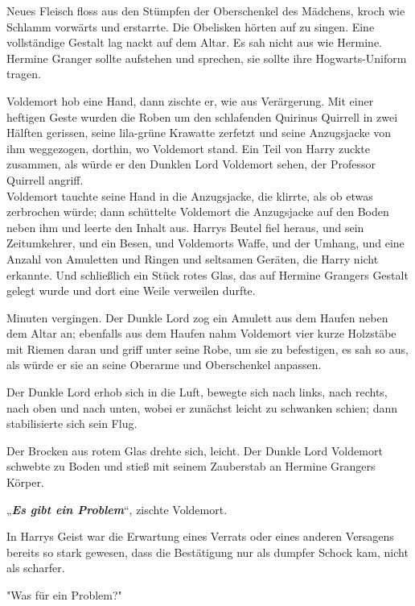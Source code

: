 {Neues Fleisch floss aus den Stümpfen der Oberschenkel des Mädchens, kroch wie Schlamm vorwärts und erstarrte. Die Obelisken hörten auf zu singen. Eine vollständige Gestalt lag nackt auf dem Altar. Es sah nicht aus wie Hermine. Hermine Granger sollte aufstehen und sprechen, sie sollte ihre Hogwarts-Uniform tragen.

Voldemort hob eine Hand, dann zischte er, wie aus Verärgerung. Mit einer heftigen Geste wurden die Roben um den schlafenden Quirinus Quirrell in zwei Hälften gerissen, seine lila-grüne Krawatte zerfetzt und seine Anzugsjacke von ihm weggezogen, dorthin, wo Voldemort stand. Ein Teil von Harry zuckte zusammen, als würde er den Dunklen Lord Voldemort sehen, der Professor Quirrell angriff.\\ Voldemort tauchte seine Hand in die Anzugsjacke, die klirrte, als ob etwas zerbrochen würde; dann schüttelte Voldemort die Anzugsjacke auf den Boden neben ihm und leerte den Inhalt aus. Harrys Beutel fiel heraus, und sein Zeitumkehrer, und ein Besen, und Voldemorts Waffe, und der Umhang, und eine Anzahl von Amuletten und Ringen und seltsamen Geräten, die Harry nicht erkannte. Und schließlich ein Stück rotes Glas, das auf Hermine Grangers Gestalt gelegt wurde und dort eine Weile verweilen durfte.

Minuten vergingen. Der Dunkle Lord zog ein Amulett aus dem Haufen neben dem Altar an; ebenfalls aus dem Haufen nahm Voldemort vier kurze Holzstäbe mit Riemen daran und griff unter seine Robe, um sie zu befestigen, es sah so aus, als würde er sie an seine Oberarme und Oberschenkel anpassen.

Der Dunkle Lord erhob sich in die Luft, bewegte sich nach links, nach rechts, nach oben und nach unten, wobei er zunächst leicht zu schwanken schien; dann stabilisierte sich sein Flug.

Der Brocken aus rotem Glas drehte sich, leicht. Der Dunkle Lord Voldemort schwebte zu Boden und stieß mit seinem Zauberstab an Hermine Grangers Körper.

„\textbf{\emph{Es gibt ein Problem}}“, zischte Voldemort.

In Harrys Geist war die Erwartung eines Verrats oder eines anderen Versagens bereits so stark gewesen, dass die Bestätigung nur als dumpfer Schock kam, nicht als scharfer.

"Was für ein Problem?"

}
